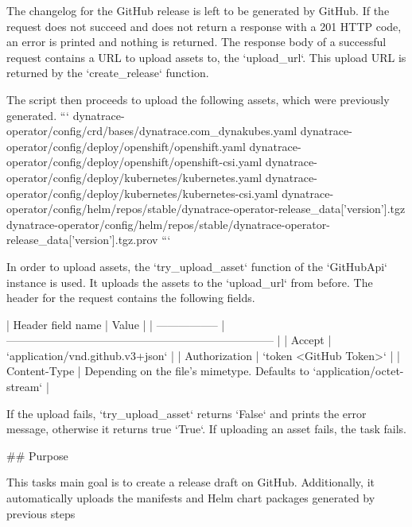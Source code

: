 The changelog for the GitHub release is left to be generated by GitHub.
If the request does not succeed and does not return a response with a 201 HTTP code, an error is printed and nothing is returned.
The response body of a successful request contains a URL to upload assets to, the `upload_url`.
This upload URL is returned by the `create_release` function.

The script then proceeds to upload the following assets, which were previously generated.
```
dynatrace-operator/config/crd/bases/dynatrace.com_dynakubes.yaml
dynatrace-operator/config/deploy/openshift/openshift.yaml
dynatrace-operator/config/deploy/openshift/openshift-csi.yaml
dynatrace-operator/config/deploy/kubernetes/kubernetes.yaml
dynatrace-operator/config/deploy/kubernetes/kubernetes-csi.yaml
dynatrace-operator/config/helm/repos/stable/dynatrace-operator-{release_data['version']}.tgz
dynatrace-operator/config/helm/repos/stable/dynatrace-operator-{release_data['version']}.tgz.prov
```

In order to upload assets, the `try_upload_asset` function of the `GitHubApi` instance is used.
It uploads the assets to the `upload_url` from before.
The header for the request contains the following fields.

| Header field name | Value                                                                    |
| ----------------- | ------------------------------------------------------------------------ |
| Accept            | `application/vnd.github.v3+json`                                         |
| Authorization     | `token <GitHub Token>`                                                   |
| Content-Type      | Depending on the file's mimetype. Defaults to `application/octet-stream` |

If the upload fails, `try_upload_asset` returns `False` and prints the error message, otherwise it returns true `True`.
If uploading an asset fails, the task fails.

## Purpose

This tasks main goal is to create a release draft on GitHub.
Additionally, it automatically uploads the manifests and Helm chart packages generated by previous steps

